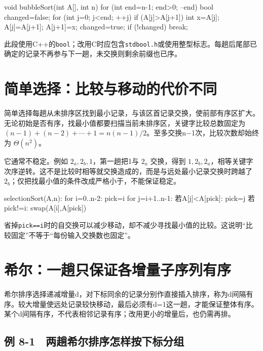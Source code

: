 \begin{codeblock}[language=C]
void bubbleSort(int A[], int n) {
    for (int end=n-1; end>0; --end) {
        bool changed=false;
        for (int j=0; j<end; ++j)
            if (A[j]>A[j+1]) {
                int x=A[j]; A[j]=A[j+1]; A[j+1]=x;
                changed=true;
            }
        if (!changed) break;
    }
}
\end{codeblock}

此段使用C++的\texttt{bool}；改用C时应包含\texttt{stdbool.h}或使用整型标志。每趟后尾部已确定的记录不再参与下一趟，未交换则剩余前缀也已序。

\section{简单选择：比较与移动的代价不同}\label{DS08-04}

简单选择每趟从未排序区找到最小记录，与该区首记录交换，使前部有序区扩大。无论初始是否有序，找最小值都要扫描当前未排序区，关键字比较总数固定为 \((n-1)+(n-2)+\cdots+1=n(n-1)/2\)。至多交换n\ensuremath{-}1次，比较次数却始终为 \(\Theta(n^2)\)。

它通常不稳定。例如 \(2_a,2_b,1\)，第一趟把1与 \(2_a\) 交换，得到 \(1,2_b,2_a\)，相等关键字次序逆转。这不是比较时相等就交换造成的，而是与远处最小记录交换时跨越了 \(2_b\)；仅把找最小值的条件改成严格小于，不能保证稳定。

\begin{codeblock}[language={}]
selectionSort(A,n):
    for i=0..n-2:
        pick=i
        for j=i+1..n-1:
            若A[j]<A[pick]: pick=j
        若pick!=i: swap(A[i],A[pick])
\end{codeblock}

省掉\texttt{pick=\allowbreak{}=\allowbreak{}i}时的自交换可以减少移动，却不减少寻找最小值的比较。这说明``比较固定''不等于``每份输入交换数也固定''。

\section{希尔：一趟只保证各增量子序列有序}\label{DS08-05}

希尔排序选择递减增量d，对下标同余的记录分别作直接插入排序，称为d间隔有序。较大增量使远处记录较快移动，最后必须有d=1这一趟，才能保证整体有序。某个d间隔有序，不代表相邻记录有序；改用更小的增量后，也仍需再排。

\subsection{例 8-1　两趟希尔排序怎样按下标分组}\label{DS08-ex1}

